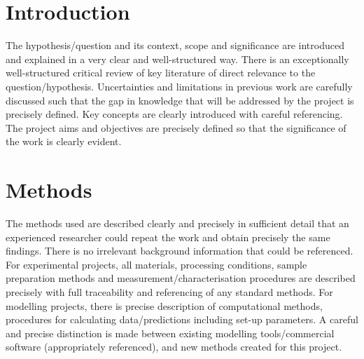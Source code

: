 \documentclass{Academic}
\begin{document}
\myabstract{}
\renewcommand{\myTitle}{Deeplearning Assignment 01}
\renewcommand{\MyAuthor}{Leon Knorr}
\renewcommand{\MyDepartment}{Mannheim Master of Datascience}
\renewcommand{\ID}{1902854}
\renewcommand{\Keywords}{Deeplearning, FNN, Backprop}
\maketitle
\onehalfspacing

\section{Introduction}

The hypothesis/question and its context, scope and significance are introduced and explained in a very clear and well-structured way\supercite{einstein}. 
There is an exceptionally well-structured critical review of key literature of direct relevance to the question/hypothesis. Uncertainties and limitations in previous work are carefully discussed such that the gap in knowledge that will be addressed by the project is precisely defined. 
Key concepts are clearly introduced with careful referencing. 
The project aims and objectives are precisely defined so that the significance of the work is clearly evident.

\section{Methods}

The methods used are described clearly and precisely in sufficient detail that an experienced researcher could repeat the work and obtain precisely the same findings. There is no irrelevant background information that could be referenced.
For experimental projects, all materials, processing conditions, sample preparation methods and measurement/characterisation procedures are described precisely with full traceability and referencing of any standard methods.
 For modelling projects, there is precise description of computational methods, procedures for calculating data/predictions including set-up parameters. A careful and precise distinction is made between existing modelling tools/commercial software (appropriately referenced), and new methods created for this project. 
\end{document}
